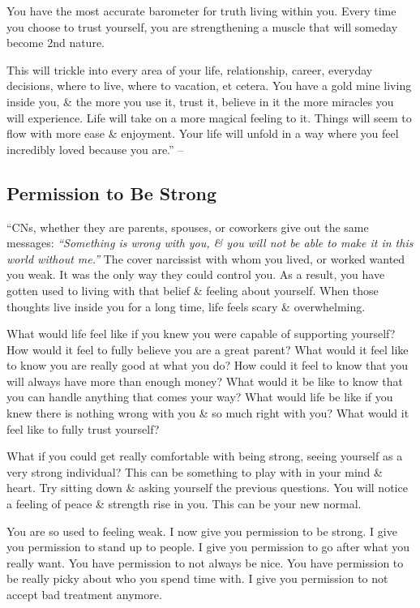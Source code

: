 \documentclass{article}
\numberwithin{equation}{section}
\begin{document}
You have the most accurate barometer for truth living within you. Every time you choose to trust yourself, you are strengthening a muscle that will someday become 2nd nature.

This will trickle into every area of your life, relationship, career, everyday decisions, where to live, where to vacation, et cetera. You have a gold mine living inside you, \& the more you use it, trust it, believe in it the more miracles you will experience. Life will take on a more magical feeling to it. Things will seem to flow with more ease \& enjoyment. Your life will unfold in a way where you feel incredibly loved because you are.'' -- \cite[pp. 166--168]{Mirza2017}

\subsection{Permission to Be Strong}
``CNs, whether they are parents, spouses, or coworkers give out the same messages: \textit{``Something is wrong with you, \& you will not be able to make it in this world without me.''} The cover narcissist with whom you lived, or worked wanted you weak. It was the only way they could control you. As a result, you have gotten used to living with that belief \& feeling about yourself. When those thoughts live inside you for a long time, life feels scary \& overwhelming.

What would life feel like if you knew you were capable of supporting yourself? How would it feel to fully believe you are a great parent? What would it feel like to know you are really good at what you do? How could it feel to know that you will always have more than enough money? What would it be like to know that you can handle anything that comes your way? What would life be like if you knew there is nothing wrong with you \& so much right with you? What would it feel like to fully trust yourself?

What if you could get really comfortable with being strong, seeing yourself as a very strong individual? This can be something to play with in your mind \& heart. Try sitting down \& asking yourself the previous questions. You will notice a feeling of peace \& strength rise in you. This can be your new normal.

You are so used to feeling weak. I now give you permission to be strong. I give you permission to stand up to people. I give you permission to go after what you really want. You have permission to not always be nice. You have permission to be really picky about who you spend time with. I give you permission to not accept bad treatment anymore.
\end{document}
